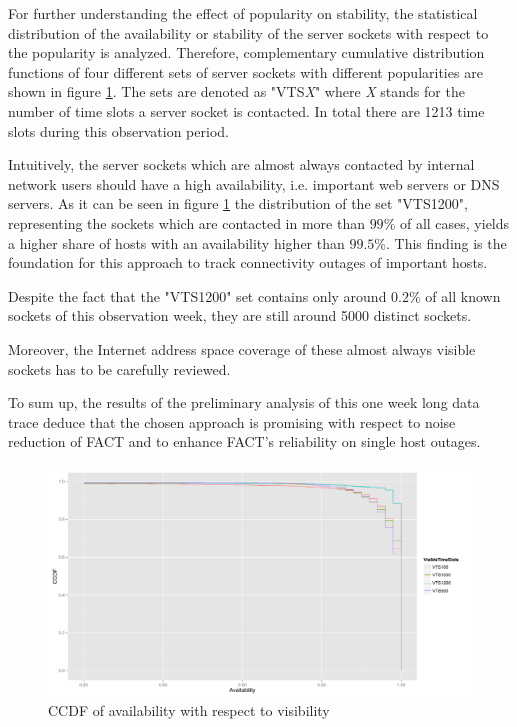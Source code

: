 \documentclass{sigcomm-alternate}
\begin{document}
For further understanding the effect of popularity on stability, the statistical 
distribution of the availability or stability of the server sockets
with respect to the popularity is analyzed. Therefore, complementary cumulative 
distribution functions of four different sets of server sockets with different 
popularities are shown in figure \ref{fig:RatioVTS}. The sets are denoted as
"VTS\emph{X}" where \emph{X} stands for the number of time slots a server socket
is contacted. In total there are 1213 time slots during this observation period.  

Intuitively, the server sockets which are almost always
contacted by internal network users should have a high availability,
i.e. important web servers or DNS servers. As it can be seen in
figure \ref{fig:RatioVTS} the distribution of the set "VTS1200", representing the
sockets which are contacted in more than $99\%$ of all cases,
yields a higher share of hosts with an availability higher than $99.5\%$.
This finding is the foundation for this approach to track connectivity outages of important hosts.

Despite the fact that the "VTS1200" set contains only around $0.2\%$
of all known sockets of this observation week, they are still around
5000 distinct sockets.

Moreover, the Internet address space coverage of these almost always
visible sockets has to be carefully reviewed.

To sum up, the results of the preliminary analysis of this one week
long data trace deduce that the chosen approach is promising with
respect to noise reduction of FACT and to enhance FACT's reliability
on single host outages.

\begin{figure}[ht!]
\centering \includegraphics[width=18cm]{images/RATIO_VTS_External.pdf}
\caption{CCDF of availability with respect to visibility}
\label{fig:RatioVTS}
\end{figure}



\end{document}
